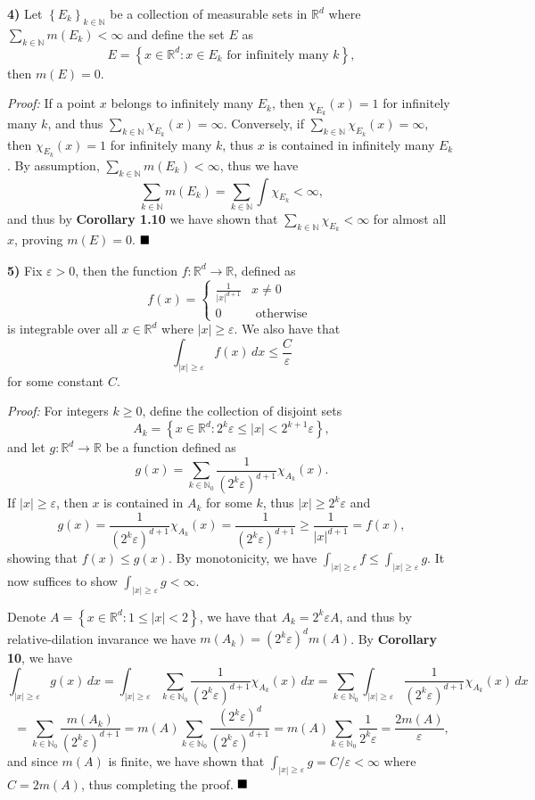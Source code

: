 \documentclass[12pt]{article}
\newcommand{\N}{\ensuremath{\mathbb{N}}}
\newcommand{\R}{\ensuremath{\mathbb{R}}}
\newcommand{\e}{\ensuremath{\varepsilon}}
\newcommand{\braceb}[1]{\left\{#1\right\}}
\newcommand{\parenb}[1]{\left(#1\right)}
\newcommand{\vertb}[1]{\left\vert#1\right\vert}
\newcommand{\proof}{\textit{Proof: }}
\newcommand{\done}{\ensuremath{\strut\hfill\blacksquare}}
\renewcommand{\t}[1]{\text{ #1 }}
\begin{document}
\textbf{4)}
Let \( \braceb{E_k}_{k \in \N} \) be a collection of measurable sets in
\( \R^d \) where \( \sum_{k \in \N} m(E_k) < \infty \) and define the set
\( E \) as
\[
	E
	= \braceb{x \in \R^d : x \in E_k \t{for infinitely many} k},
\]
then \( m(E) = 0 \).

\proof
If a point \( x \) belongs to infinitely many \( E_k \), then
\( \chi_{E_k}(x) = 1 \) for infinitely many \( k \), and thus
\( \sum_{k \in \N} \chi_{E_k}(x) = \infty \).
Conversely, if \( \sum_{k \in \N} \chi_{E_k}(x) = \infty \), then
\( \chi_{E_k}(x) = 1 \) for infinitely many \( k \), thus \( x \) is contained
in infinitely many \( E_k \).
By assumption, \( \sum_{k \in \N} m(E_k) < \infty \), thus we have
\[
	\sum_{k \in \N} m(E_k)
	= \sum_{k \in \N} \int \chi_{E_k}
	< \infty,
\]
and thus by \textbf{Corollary 1.10} we have shown that
\( \sum_{k \in \N} \chi_{E_k} < \infty \) for almost all \( x \), proving
\( m(E) = 0 \).
\done

\textbf{5)}
Fix \( \e > 0 \), then the function \( f : \R^d \to \R \), defined as
\[
	f(x)
	= \begin{cases}
		\frac{1}{\vertb{x}^{d + 1}} & x \ne 0 \\
		0                           & \t{otherwise}
	\end{cases}
\]
is integrable over all \( x \in \R^d \) where \( \vertb{x} \geq \e \).
We also have that
\[
	\int_{\vertb{x} \geq \e} f(x) \, dx
	\leq \frac{C}{\e}
\]
for some constant \( C \).

\proof
For integers \( k \geq 0 \), define the collection of disjoint sets
\[
	A_k = \braceb{x \in \R^d : 2^k\e \leq \vertb{x} < 2^{k + 1}\e},
\]
and let
\( g : \R^d \to \R \) be a function defined as
\[
	g(x)
	= \sum_{k \in \N_0} \frac{1}{\parenb{2^{k}\e}^{d + 1}} \chi_{A_k}(x).
\]
If \( \vertb{x} \geq \e \), then \( x \) is contained in \( A_k \) for some
\( k \), thus \( \vertb{x} \geq 2^k\e \) and
\[
	g(x)
	= \frac{1}{\parenb{2^{k}\e}^{d + 1}} \chi_{A_k}(x)
	= \frac{1}{(2^k\e)^{d + 1}}
	\geq \frac{1}{\vertb{x}^{d + 1}}
	= f(x),
\]
showing that \( f(x) \leq g(x) \).
By monotonicity, we have
\( \int_{\vertb{x} \geq \e} f \leq \int_{\vertb{x} \geq \e} g \).
It now suffices to show \( \int_{\vertb{x} \geq \e} g < \infty \).

Denote \( A = \braceb{x \in \R^d : 1 \leq \vertb{x} < 2} \), we have that
\( A_k = 2^k\e A \), and thus by relative-dilation invarance we have
\( m(A_k) = (2^k\e)^d m(A) \).
By \textbf{Corollary 10}, we have
\[
	\int_{\vertb{x} \geq \e} g(x) \, dx
	= \int_{\vertb{x} \geq \e} \sum_{k \in \N_0}
	\frac{1}{\parenb{2^k\e}^{d + 1}} \chi_{A_k}(x) \, dx
	= \sum_{k \in \N_0} \int_{\vertb{x} \geq \e}
	\frac{1}{\parenb{2^k\e}^{d + 1}} \chi_{A_k}(x) \, dx
\]
\[
	= \sum_{k \in \N_0} \frac{m(A_k)}{\parenb{2^k\e}^{d + 1}}
	= m(A) \sum_{k \in \N_0} \frac{
		\parenb{2^k\e}^{d}
	}{
		\parenb{2^k\e}^{d + 1}
	}
	= m(A) \sum_{k \in \N_0} \frac{1}{2^k\e}
	= \frac{2m(A)}{\e},
\]
and since \( m(A) \) is finite, we have shown that
\( \int_{\vertb{x} \geq \e} g = C/\e < \infty \) where \( C = 2m(A) \), thus
completing the proof.
\done

{}
\end{document}
